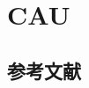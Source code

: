 \documentclass[twoside]{article}
\begin{document}
    \section*{CAU}

    \subsection{参考文献}
    \cite{Huzhenzhen2018}
    \cite{王夫之1845--}\cite{KENNEDY1975-339-360}%
    \nocite{汪昂1881--}%

\printbibliography

    
\end{document}
